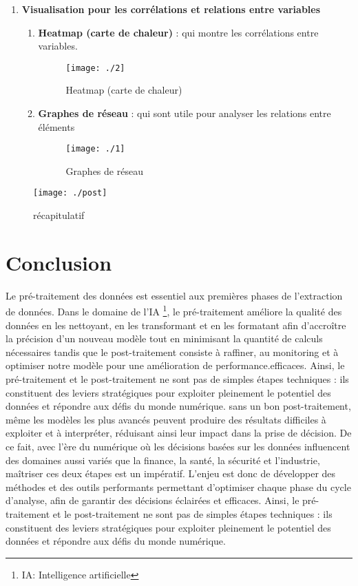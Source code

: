 \documentclass[a4paper, 12pt]{article}
\begin{document}
\begin{enumerate}
\begin{enumerate}
			\item \justifying \textbf{
				Visualisation pour les corrélations et relations entre variables
			}
			\begin{enumerate}
				\item \justifying \textbf{Heatmap (carte de chaleur) }: qui  montre les corrélations entre variables.
				\begin{figure}[h]
					\centering
					\texttt{[image: ./2]}
					\caption{Heatmap (carte de chaleur)   }
				\end{figure} \newpage 
				\item \justifying \textbf{Graphes de réseau }: qui sont  utile pour analyser les relations entre éléments  
				\begin{figure}[h]
					\centering
					\texttt{[image: ./1]}
					\caption{Graphes de réseau  }
				\end{figure}
			\end{enumerate}
			
		\end{enumerate}
	
	\end{enumerate}
	\begin{figure}[h]
		\centering
		\texttt{[image: ./post]}
		\caption{récapitulatif}
	\end{figure}
		
	
	\section{Conclusion}\justifying Le pré-traitement \cite{pré}
	 des données est essentiel aux premières phases de l’extraction de données. Dans le domaine de l'IA \footnote{IA: Intelligence artificielle}, le pré-traitement améliore la qualité des données \cite{ps} en les nettoyant, en les transformant et en les formatant afin d'accroître la précision d'un nouveau modèle tout en minimisant la quantité de calculs nécessaires tandis que le post-traitement \cite{Postprocessing} consiste à raffiner, au monitoring et à optimiser notre modèle pour une amélioration de performance.efficaces.
	Ainsi, le pré-traitement et le post-traitement ne sont pas de simples étapes techniques : ils constituent des leviers stratégiques pour exploiter pleinement le potentiel des données et répondre aux défis du monde numérique.
	sans un bon post-traitement, même les modèles les plus avancés peuvent produire des résultats difficiles à exploiter et à interpréter, réduisant ainsi leur impact dans la prise de décision. 
	De ce fait, avec l’ère du numérique où les décisions basées sur les données \cite{tech} influencent des domaines aussi variés que la finance, la santé, la sécurité et l’industrie, maîtriser ces deux étapes est un impératif. L’enjeu est donc de développer des méthodes et des outils performants permettant d’optimiser chaque phase du cycle d’analyse, afin de garantir des décisions éclairées et efficaces.
	Ainsi, le pré-traitement et le post-traitement ne sont pas de simples étapes techniques : ils constituent des leviers stratégiques pour exploiter\cite{exo} pleinement le potentiel des données et répondre aux défis du monde numérique.
	
\end{document}
